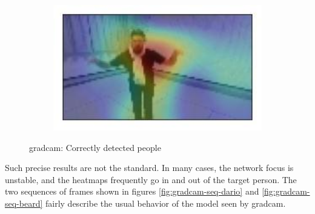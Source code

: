 \begin{figure}[!h]
\begin{center}
\begin{subfigure}[h]{0.24\textwidth}
		\end{subfigure}
		\hfill
		\begin{subfigure}[h]{0.24\textwidth}
			\centering
			\includegraphics[width=1\textwidth]{"contents/images/gradcam/gradcam-ok-4"}
		\end{subfigure}
	\end{center}
	\vspace{-0.5cm}
	\caption[\gls{gradcam}: Correctly detected people]{\gls{gradcam}: Correctly detected people}
	\label{fig:gradcam-ok}
\end{figure}

Such precise results are not the standard. In many cases, the network focus is unstable, and the heatmaps frequently go in and out of the target person. The two sequences of frames shown in figures \ref{fig:gradcam-seq-dario} and \ref{fig:gradcam-seq-beard} fairly describe the usual behavior of the model seen by \gls{gradcam}.

